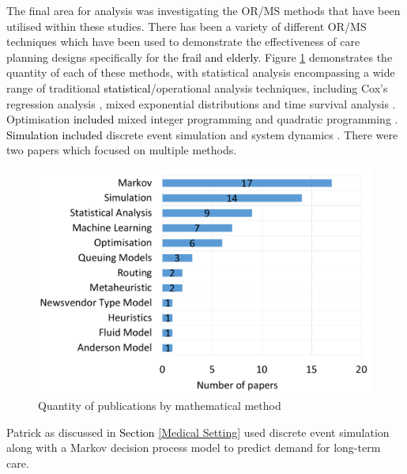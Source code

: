 \documentclass[../thesis.tex]{subfiles}
\begin{document}
The final area for analysis was investigating the OR/MS methods that have been utilised within these studies. There has been a variety of different OR/MS techniques which have been used to demonstrate the effectiveness of care planning designs specifically for the \textcolor{black}{frail and elderly}. Figure \ref{fig:Mathematical} demonstrates the quantity of each of these methods, with statistical analysis encompassing a wide range of traditional \textcolor{black}{statistical}/operational analysis techniques, including Cox's regression analysis \cite{Heggestad}, mixed exponential distributions \cite{Harrison} and time survival analysis \cite{Muramatsu}. Optimisation \textcolor{black}{included} %
mixed integer programming \textcolor{black}{\cite{Davari}} and quadratic programming \textcolor{black}{\cite{Tao}}. \textcolor{black}{Simulation} \textcolor{black}{included} %
discrete event simulation \textcolor{black}{\cite{Zhang1}} 
and system dynamics \textcolor{black}{\cite{Cepoiu}}.
There were two papers which focused on multiple methods.

\begin{figure}[H]
\centering
    \includegraphics[scale = 0.45]{Chapter2/Figures/ModelsGraph.pdf}
    \caption{Quantity of publications by mathematical method}
    \label{fig:Mathematical}
\end{figure}

Patrick \cite{Patrick} as discussed in \textcolor{black}{Section} \ref{Medical Setting} used discrete event simulation along with a Markov decision process model to predict demand for long-term care. 
\end{document}
